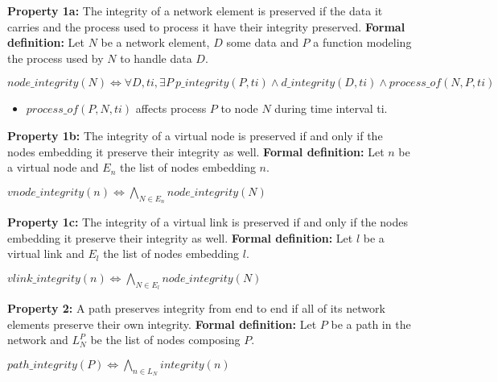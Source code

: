 \textbf{Property 1a:} The integrity of a network element is preserved if the data it carries and the process used to process it have their integrity preserved. 
\newline
\textbf{Formal definition:} Let $N$ be a network element, $D$ some data and $P$ a function modeling the process used by $N$ to handle data $D$.

\begin{myformula}
$node\_integrity(N) \Leftrightarrow \forall D,ti,\exists P~p\_integrity(P,ti) \wedge d\_integrity(D,ti) \wedge process\_of(N,P,ti)$
\end{myformula}

\begin{itemize}
\item $process\_of(P,N,ti)$ affects process $P$ to node $N$ during time interval ti.
\end{itemize}

\textbf{Property 1b:} The integrity of a virtual node is preserved if and only if the nodes embedding it preserve their integrity as well.
\newline
\textbf{Formal definition:} Let $n$ be a virtual node and $E_n$ the list of nodes embedding $n$.

\begin{myformula}
$vnode\_integrity(n) \Leftrightarrow \bigwedge\limits_{N \in E_n} node\_integrity(N)$
\end{myformula}

\textbf{Property 1c:} The integrity of a virtual link is preserved if and only if the nodes embedding it preserve their integrity as well.
\newline
\textbf{Formal definition:} Let $l$ be a virtual link and $E_l$ the list of nodes embedding $l$.

\begin{myformula}
$vlink\_integrity(n) \Leftrightarrow \bigwedge\limits_{N \in E_l} node\_integrity(N)$
\end{myformula}


\textbf{Property 2:} A path preserves integrity from end to end if all of its network elements preserve their own integrity.
\newline \textbf{Formal definition:} Let $P$ be a path in the network and $L^P_N$ be the list of nodes composing $P$.
\newline

\begin{myformula}
$path\_integrity(P) \Leftrightarrow \bigwedge\limits_{n \in L_N}integrity(n) $
\end{myformula}

